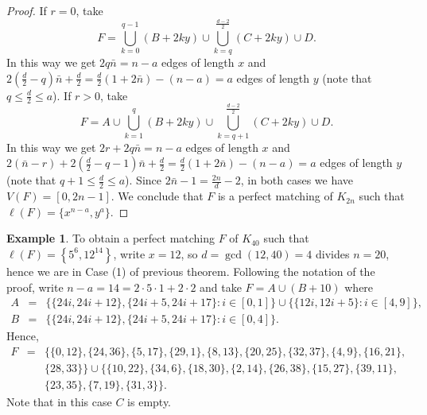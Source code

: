 \documentclass{amsart}
\theoremstyle{definition}
\newtheorem{ex}[defi]{Example}
\numberwithin{equation}{section}
\begin{document}
\begin{proof}
If $r=0$, take
$$F=\bigcup_{k=0}^{q-1} (B + 2ky)\cup \bigcup_{k=q}^{\frac{d-2}{2}} (C+2ky)\cup D.$$
In this way  we get $2q\bar n = n-a$ edges of length $x$ and
$2\left(\frac{d}{2}-q\right)\bar n+ \frac{d}{2}= \frac{d}{2}(1+2\bar n)-(n-a)= a$ edges of length $y$
(note that $q\leq \frac{d}{2}\leq a$).
If $r>0$, take
$$F=A \cup \bigcup_{k=1}^{q} (B + 2ky)\cup \bigcup_{k=q+1}^{\frac{d-2}{2}} (C+2ky)\cup D.$$
In this way  we get $2r+2q\bar n = n-a$ edges of length $x$ and
$2(\bar n -r)+2\left(\frac{d}{2}-q-1\right)\bar n+ \frac{d}{2}= \frac{d}{2}(1+2\bar n)-(n-a)= a$ edges of length $y$
(note that $q+1\leq \frac{d}{2}\leq a$).
Since $2\bar n-1=\frac{2n}{d}-2$, in  both cases we have $V(F)=[0,2n-1]$.
We conclude that $F$ is a perfect matching of $K_{2n}$ such that $\ell(F)=\{x^{n-a}, y^{a}\}$.
\end{proof}


\begin{ex}
To obtain a perfect matching $F$ of $K_{40}$ such that $\ell(F)=\left\{5^6, 12^{14}\right\}$, write
$x=12$, so $d=\gcd(12,40)=4$ divides $n=20$, hence we are in Case (1) of previous theorem.
Following the notation of the proof, write  $n-a= 14 = 2\cdot 5 \cdot 1 + 2\cdot 2$  and take $F=A\cup(B+10)$ where
$$\begin{array}{rcl}
A & =&  \{\{24i,24i+12\}, \{24i+5,24i+17\}: i \in[0,1]\} \cup \{ \{12i,12i+5\} : i \in [4,9]\}, \\
B &=& \{\{24i, 24i+12\}, \{24i+5, 24i+17\}: i \in [0,4]\}.
    \end{array}$$
Hence,
$$\begin{array}{rcl}
F & =&  \{\{0,12\}, \{24,36\},  \{5,17\}, \{29,1\},  \{8, 13\}, \{20,25\}, \{32,37\}, \{4,9\},\{16,21\}, \\
&& \{28,33\} \}\cup  \{ \{10,22\}, \{34,6\}, \{18,30\}, \{2,14\},\{26,38\}, \{15, 27\}, \{39, 11\}, \\
&& \{23, 35\}, \{7, 19\}, \{31, 3\}  \}.
    \end{array}$$
Note that in this case $C$ is empty.
\end{ex}
\end{document}
